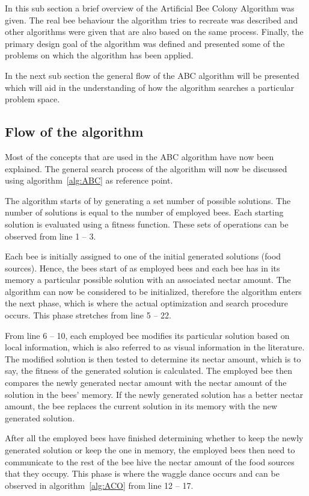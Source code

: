 In this sub section a brief overview of the Artificial Bee Colony Algorithm was given. The real bee behaviour the algorithm tries to recreate was described and other algorithms were given that are also based on the same process. Finally, the primary design goal of the algorithm was defined and presented some of the problems on which the algorithm has been applied.

In the next sub section the general flow of the ABC algorithm will be presented which will aid in the understanding of how the algorithm searches a particular problem space. 
\subsection{Flow of the algorithm}
Most of the concepts that are used in the ABC algorithm have now been explained. The general search process of the algorithm will now be discussed using algorithm~\ref{alg:ABC} as reference point.

The algorithm starts of by generating a set number of possible solutions. The number of solutions is equal to the number of employed bees. Each starting solution is evaluated using a fitness function. These sets of operations can be observed from line 1 -- 3.

Each bee is initially assigned to one of the initial generated solutions (food sources). Hence, the bees start of as employed bees and each bee has in its memory a particular possible solution with an associated nectar amount. The algorithm can now be considered to be initialized, therefore the algorithm enters the next phase, which is where the actual optimization and search procedure occurs. This phase stretches from line 5 -- 22.

From line 6 -- 10, each employed bee modifies its particular solution based on local information, which is also referred to as visual information in the literature. The modified solution is then tested to determine its nectar amount, which is to say, the fitness of the generated solution is calculated. The employed bee then compares the newly generated nectar amount with the nectar amount of the solution in the bees' memory. If the newly generated solution has a better nectar amount, the bee replaces the current solution in its memory with the new generated solution.

After all the employed bees have finished determining whether to keep the newly generated solution or keep the one in memory, the employed bees then need to communicate to the rest of the bee hive the nectar amount of the food sources that they occupy. This phase is where the waggle dance occurs and can be observed in algorithm~\ref{alg:ACO} from line 12 -- 17.

